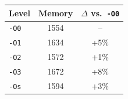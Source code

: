 \begin{tabular*}{\columnwidth}{@{\extracolsep\fill}lcc@{\extracolsep\fill}}
\toprule
\textbf{Level} & \textbf{Memory} & \textbf{$\Delta$ vs.\ \texttt{-O0}} \\
\midrule
\texttt{-O0} & 1554 & -- \\
\texttt{-O1} & 1634 & +5\% \\
\texttt{-O2} & 1572 & +1\% \\
\texttt{-O3} & 1672 & +8\% \\
\texttt{-Os} & 1594 & +3\% \\
\bottomrule
\end{tabular*}
